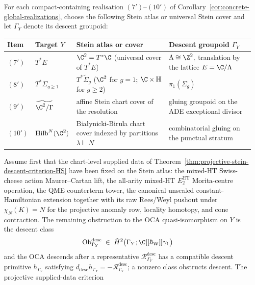 \begin{cor}\label{cor:compact-containing-descent}
For each compact-containing realisation \((7')\)--\((10')\) of
Corollary~\ref{cor:concrete-global-realizations}, choose the following
Stein atlas or universal Stein cover and let \(\Gamma_Y\) denote its
descent groupoid:
\begin{center}
\small
\begin{tabular}{@{}p{}p{}p{}p{}@{}}
\hline
\textbf{Item} & \textbf{Target \(Y\)} & \textbf{Stein atlas or cover} & \textbf{Descent groupoid \(\Gamma_Y\)}\\
\hline
\((7')\) & \(T^*E\) & \(\C^2=T^*\C\) (universal cover of \(T^*E\)) & \(\Lambda\cong\Z^2\), translation by the lattice \(E=\C/\Lambda\)\\
\((8')\) & \(T^*\Sigma_{g\geq 1}\) & \(T^*\widetilde\Sigma_g\) (\(\C^2\) for \(g=1\); \(\C\times\mathbb H\) for \(g\geq 2\)) & \(\pi_1(\Sigma_g)\)\\
\((9')\) & \(\widetilde{\C^2/\Gamma}\) & affine Stein chart cover of the resolution & gluing groupoid on the ADE exceptional divisor\\
\((10')\) & \(\mathrm{Hilb}^N(\C^2)\) & Bia\l ynicki-Birula chart cover indexed by partitions \(\lambda\vdash N\) & combinatorial gluing on the punctual stratum\\
\hline
\end{tabular}
\end{center}
Assume first that the chart-level supplied data of
Theorem~\ref{thm:projective-stein-descent-criterion-HS} have been fixed
on the Stein atlas: the mixed-HT Swiss-cheese action Maurer--Cartan
lift, the all-arity mixed-HT \(E_2^{\mathrm{HT}}\) Morita-centre
operation, the QME counterterm tower, the canonical unscaled
constant-Hamiltonian extension together with its raw Rees/Weyl pushout
under \(\chi_N(K)=N\) for the projective anomaly row, locality homotopy,
and cone contraction.  The remaining obstruction to the OCA
quasi-isomorphism on \(Y\) is the descent class
\[
  \operatorname{Ob}^{\mathrm{desc}}_{\Gamma_Y}
   \;\in\;
   \check H^2\bigl(
   \Gamma_Y;\C[[\hbar_{\mathrm W}]]\gamma_{\mathbf1}\bigr)
\]
and the OCA descends after a representative
\(\mathcal R^{\mathrm{desc}}_{\Gamma_Y}\) has a compatible descent
primitive \(h_{\Gamma_Y}\) satisfying
\(d_{\mathrm{desc}}h_{\Gamma_Y}
=-\mathcal R^{\mathrm{desc}}_{\Gamma_Y}\); a nonzero class obstructs
descent.
The projective supplied-data criterion

\end{cor}
